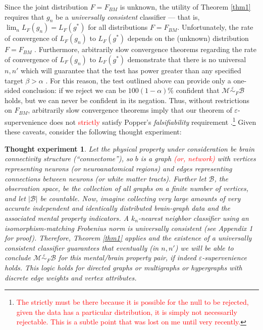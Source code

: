 \documentclass{article}
\newcommand{\mB}{\mathcal{B}}
\newcommand{\mM}{\mathcal{M}}
\newcommand{\MeB}{\mM \overset{\varepsilon}{{\sim}}_F \mB}
\providecommand{\tr}[1]{\textcolor{red}{#1}}
\newtheorem{thex}{Thought experiment}
\begin{document}
Since the joint distribution $F=F_{BM}$ is unknown, the utility of Theorem \ref{thm1} requires that $g_n$ be a {\it universally consistent} classifier --- that is, $\lim_n L_{F}(g_n) = L_{F}(g^*)$ for all distributions $F=F_{BM}$. Unfortunately, the rate of convergence of $L_{F}(g_n)$ to $L_{F}(g^*)$ depends on the (unknown) distribution $F=F_{BM}$ \cite{DGL96}. Furthermore, arbitrarily slow convergence theorems regarding the rate of convergence of $L_{F}(g_n)$ to $L_{F}(g^*)$ demonstrate that there is no universal $n,n'$ which will guarantee that the test has power greater than any specified target $\beta > \alpha$ \cite{Devroye83}. For this reason, the test outlined above can provide only a one-sided conclusion: if we reject we can be $100(1-\alpha)$\% confident that $\MeB$ holds, but we can never be confident in its negation. Thus, without restrictions on $F_{BM}$, arbitrarily slow convergence theorems imply that our theorem of $\varepsilon$-supervenience does not \tr{strictly} satisfy Popper's {\it falsifiability} requirement \cite{Popper}.\footnote{\tr{The strictly must be there because it is possible for the null to be rejected, given the data has a particular distribution, it is simply not necessarily rejectable.  This is a subtle point that was lost on me until very recently.}} Given these caveats, consider the following thought experiment:

\begin{thex}

Let the physical property under consideration be brain connectivity structure (``connectome''), so $b$ is a graph \tr{(or, network)} with vertices representing neurons (or neuroanatomical regions) and edges representing connections between neurons (or white matter tracts). Further let $\mB$, the observation space, be the collection of all graphs on a finite number of vertices, and let $|\mB|$ be countable. Now, imagine collecting very large amounts of very accurate independent and identically distributed brain-graph data and the associated mental property indicators. A $k_n$-nearest neighbor classifier using an isomorphism-matching Frobenius norm is universally consistent (see Appendix 1 for proof). Therefore, Theorem \ref{thm1} applies and the existence of a universally consistent classifier guarantees that eventually (in $n,n'$) we will be able to conclude $\MeB$ for this mental/brain property pair, if indeed $\varepsilon$-supervenience holds. This logic holds for directed graphs or multigraphs or hypergraphs with discrete edge weights and vertex attributes.

\end{thex}
\end{document}

